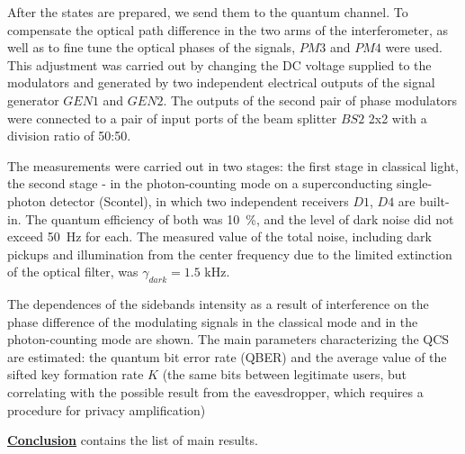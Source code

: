 After the states are prepared, we send them to the quantum channel. To compensate the optical path difference in the two arms of the interferometer, as well as to fine tune the optical phases of the signals, $PM3$ and $PM4$ were used. This adjustment was carried out by changing the DC voltage supplied to the modulators and generated by two independent electrical outputs of the signal generator $GEN1$ and $GEN2$. The outputs of the second pair of phase modulators were connected to a pair of input ports of the beam splitter $BS2$ 2x2 with a division ratio of 50:50.

The measurements were carried out in two stages: the first stage in classical light, the second stage - in the photon-counting mode on a superconducting single-photon detector (Scontel), in which two independent receivers $D1$, $D4$ are built-in. The quantum efficiency of both was 10~\%, and the level of dark noise did not exceed 50~Hz for each. The measured value of the total noise, including dark pickups and illumination from the center frequency due to the limited extinction of the optical filter, was $\gamma_{dark} = 1.5$ kHz.

The dependences of the sidebands intensity as a result of interference on the phase difference of the modulating signals in the classical mode and in the photon-counting mode are shown. The main parameters characterizing the QCS are estimated: the quantum bit error rate (QBER) and the average value of the sifted key formation rate $ K $ (the same bits between legitimate users, but correlating with the possible result from the eavesdropper, which requires a procedure for privacy amplification)



 \underline{\textbf{Conclusion}} contains the list of main results. 

  


